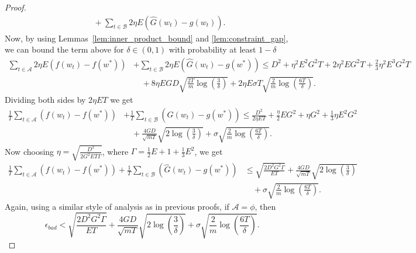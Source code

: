 \documentclass{article} %
\def\A{{\mathcal A}}
\def\B{{\mathcal B}}
\begin{document}
\begin{proof}
\begin{equation*}
\begin{aligned}
        &\quad + \sum_{t \in \B}2\eta E(\hat{G}(w_t) - g(w_t)).
    \end{aligned}
    \end{equation*}
    Now, by using Lemmas~\ref{lem:inner_product_bound} and \ref{lem:constraint_gap}, we can bound the term above for $\delta \in (0,1)$ with probability at least $1-\delta$
    \begin{equation*}
    \begin{aligned}
        \sum_{t \in \A}2\eta E(f(w_t) - f(w^*) ) &+ \sum_{t \in \B} 2\eta E(\hat{G}(w_t) - g(w^*)) \leq D^2 + \eta^2E^2G^2T + 2\eta^2EG^2T + \frac{2}{3}\eta^2 E^3G^2T 
        \\
        &\quad + 8\eta EGD\sqrt{\frac{2T}{m}\log\left(\frac{3}{\delta}\right)} +  2\eta E\sigma T \sqrt{\frac{2}{m} \log\left(\frac{6T}{\delta}\right)}.
    \end{aligned}
    \end{equation*}
    Dividing both sides by $2\eta E T$ we get
    \begin{equation*}
    \begin{aligned}
        \frac{1}{T}\sum_{t \in \A}(f(w_t) - f(w^*) ) & + \frac{1}{T}\sum_{t \in \B} (\hat{G}(w_t) - g(w^*)) \leq \frac{D^2}{2\eta E T} + \frac{\eta}{2} E G^2 + \eta G^2 + \frac{1}{3}\eta E^2 G^2 
        \\
        &\quad + \frac{4GD}{\sqrt{mT}}\sqrt{2\log\left(\frac{3}{\delta}\right)} +  \sigma\sqrt{\frac{2}{m} \log\left(\frac{6T}{\delta}\right)}.
    \end{aligned}
    \end{equation*}
    Now choosing $\eta = \sqrt{\frac{D^2}{2G^2 E T \Gamma}}$, where $\Gamma = \frac{1}{2} E + 1 + \frac{1}{3} E^2$, we get
    \begin{equation*}
    \begin{aligned}
        \frac{1}{T}\sum_{t\in \A}(f(w_t) - f(w^*) ) + \frac{1}{T}\sum_{t\in \B}(\hat{G}(w_t) - g(w^*)) &\leq \sqrt{\frac{{2 D^2 G^2 \Gamma}}{{E T}}}
        + \frac{4GD}{\sqrt{mT}}\sqrt{2\log\left(\frac{3}{\delta}\right)}
        \\
        &\quad +  \sigma\sqrt{\frac{2}{m} \log\left(\frac{6T}{\delta}\right)}.
    \end{aligned}
    \end{equation*}
    Again, using a similar style of analysis as in previous proofs, if $\A = \phi$, then
    $$\epsilon_{bad} < \sqrt{\frac{{2 D^2 G^2 \Gamma}}{{E T}}}
    + \frac{4GD}{\sqrt{mT}}\sqrt{2\log\left(\frac{3}{\delta}\right)}
    +  \sigma\sqrt{\frac{2}{m} \log\left(\frac{6T}{\delta}\right)}.$$

\end{proof}
\end{document}
